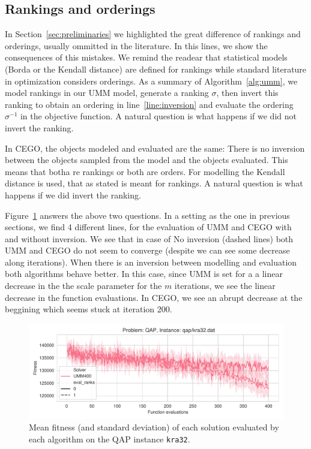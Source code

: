 \documentclass[sigconf,dvipsnames]{acmart}
\begin{document}
\subsection{Rankings and orderings}
In Section~\ref{sec:preliminaries} we highlighted the great difference of rankings and orderings, usually ommitted in the literature. In this lines, we show the consequences of this mistakes. We remind the readear that statistical models (Borda or the Kendall distance) are defined for rankings while standard literature in optimization considers orderings. As a summary of Algorithm~\ref{alg:umm}, we model rankings in our UMM model, generate a ranking $\sigma$, then invert this ranking to obtain an ordering in line~\ref{line:inversion} and evaluate the ordering $\sigma^{-1}$ in the objective function. A natural question is what happens if we did not invert the ranking. 

In CEGO, the objects modeled and evaluated are the same: There is no inversion between the objects sampled from the model and the objects evaluated. This means that botha re rankings or both are orders. For modelling the Kendall distance is used, that as stated is meant for rankings. A natural question is what happens if we did invert the ranking. 

Figure~\ref{fig:rankorder} answers the above two questions. In a setting as the one in previous sections, we find 4 different lines, for the evaluation of UMM and CEGO with and without inversion. We see that in case of No inversion (dashed lines) both UMM and CEGO do not seem to converge (despite we can see some decrease along iterations). When there is an inversion between modelling and evaluation both algorithms behave better. In this case, since UMM is set for a a linear decrease in the the scale parameter for the $m$ iterations, we see the linear decrease in the function evaluations. In CEGO, we see an abrupt decrease at the beggining which seems stuck at iteration 200. 

\begin{figure}[tp]
  \centering%
  \includegraphics[width=\textwidth]{../img/fitness_real_qap_kra32_dat}
  \caption{Mean fitness  (and standard deviation)  of each solution evaluated by each algorithm on the QAP instance \texttt{kra32}.}
  \label{fig:rankorder}
\end{figure}
\end{document}

